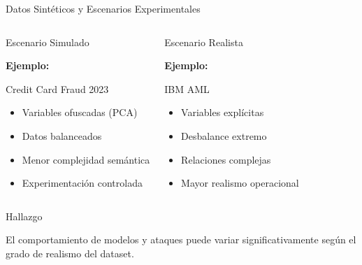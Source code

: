\documentclass[aspectratio=169, 8pt]{beamer}
\begin{document}
\begin{frame}{Datos Sintéticos y Escenarios Experimentales}

\begin{columns}


\begin{block}{Escenario Simulado}

\textbf{Ejemplo:}

Credit Card Fraud 2023

\vspace{0.1cm}

\begin{itemize}

\item Variables ofuscadas (PCA)

\item Datos balanceados

\item Menor complejidad semántica

\item Experimentación controlada

\end{itemize}

\end{block}




\begin{block}{Escenario Realista}

\textbf{Ejemplo:}

IBM AML

\vspace{0.1cm}

\begin{itemize}

\item Variables explícitas

\item Desbalance extremo

\item Relaciones complejas

\item Mayor realismo operacional

\end{itemize}

\end{block}

\end{columns}

\vspace{0.25cm}

\begin{alertblock}{Hallazgo}

El comportamiento de modelos y ataques
puede variar significativamente según
el grado de realismo del dataset.

\end{alertblock}

\end{frame}
\end{document}
